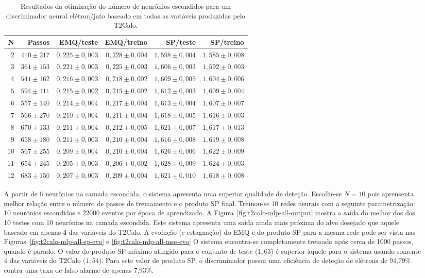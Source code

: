 \begin{table}
\caption{Resultados da otimização do número de neurônios escondidos para um
discriminador neural elétron/jato baseado em todas as variáveis produzidas
pelo T2Calo.}
\label{tab:t2calo-all-hidden-choice}
\begin{center}
\begin{tabular}{|r|r|r|r|r|r|} \hline
N & Passos & EMQ/teste & EMQ/treino & SP/teste & SP/treino \\ \hline 
$2$ & $410\pm217$ & $0,225\pm0,003$ & $0,228\pm0,004$ & $1,598\pm0,004$ & $1,585
\pm0,008$ \\
$3$ & $361\pm153$ & $0,221\pm0,003$ & $0,225\pm0,003$ & $1,606\pm0,003$ & $1,592
\pm0,003$ \\
$4$ & $541\pm162$ & $0,216\pm0,003$ & $0,218\pm0,002$ & $1,609\pm0,005$ & $1,604
\pm0,006$ \\
$5$ & $594\pm111$ & $0,215\pm0,002$ & $0,215\pm0,002$ & $1,612\pm0,003$ & $1,609
\pm0,004$ \\
$6$ & $557\pm140$ & $0,214\pm0,004$ & $0,217\pm0,004$ & $1,613\pm0,004$ & $1,607
\pm0,007$ \\
$7$ & $566\pm270$ & $0,210\pm0,004$ & $0,211\pm0,004$ & $1,618\pm0,005$ & $1,616
\pm0,003$ \\
$8$ & $670\pm133$ & $0,211\pm0,004$ & $0,212\pm0,005$ & $1,621\pm0,007$ & $1,617
\pm0,013$ \\
$9$ & $658\pm180$ & $0,211\pm0,003$ & $0,210\pm0,004$ & $1,616\pm0,008$ & $1,619
\pm0,008$ \\
$10$ & $567\pm255$ & $0,209\pm0,004$ & $0,210\pm0,004$ & $1,626\pm0,006$ & $1,62
2\pm0,009$ \\
$11$ & $654\pm245$ & $0,205\pm0,003$ & $0,206\pm0,002$ & $1,628\pm0,009$ & $1,62
4\pm0,003$ \\
$12$ & $683\pm150$ & $0,207\pm0,003$ & $0,209\pm0,004$ & $1,621\pm0,010$ & $1,61
8\pm0,008$ \\
\hline
\end{tabular}
\end{center}
\end{table}

A partir de 6 neurônios na camada escondida, o sistema apresenta uma superior
qualidade de deteção. Escolhe-se $N=10$ pois aprensenta melhor relação entre o
número de passos de treinamento e o produto SP final. Treinou-se 10 redes
neurais com a seguinte parametrização: 10 neurônios escondidos e 22000 eventos
por época de aprendizado. A Figura~\ref{fig:t2calo-mlp-all-output} mostra a
saída do melhor dos dos 10 testes com 10 neurônios na camada escondida. Este
sistema apresenta uma saída ainda mais próxima do alvo desejado que aquele
baseado em apenas 4 das variáveis do T2Calo. A evolução (e estagnação) do EMQ
e do produto SP para a mesma rede pode ser vista nas
Figuras~\ref{fig:t2calo-mlp-all-sp-evo} e \ref{fig:t2calo-mlp-all-mse-evo} O
sistema encontra-se completamente treinado após cerca de 1000 passos, quando é
parado. O valor do produto SP máximo atingido para o conjunto de teste
($1,63$) é superior àquele para o sistema usando somente 4 das variáveis do
T2Calo ($1,54$). Para este valor de produto SP, o discriminador possui uma
eficiência de deteção de elétrons de 94,79\% contra uma taxa de falso-alarme
de apenas 7,93\%.

